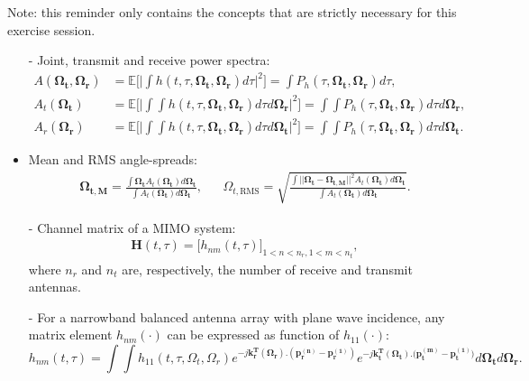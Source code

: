 \documentclass [a4paper, 11pt] {article}
\begin{document}
    \makesessiontitle

    \begin{reminder}

    Note: this reminder only contains the concepts that are strictly necessary for this exercise session.

\begin{itemize}
    \item[-] Joint, transmit and receive power spectra:
    \begin{align}
    A(\mathbf{\Omega_t},\mathbf{\Omega_r}) &= \mathbb{E}\Big[ \Big|\int h(t,\tau, \mathbf{\Omega_t},\mathbf{\Omega_r}) d\tau  \Big|^2 \Big] = \int P_h(\tau, \mathbf{\Omega_t},\mathbf{\Omega_r}) d\tau,\\
    A_t(\mathbf{\Omega_t}) &= \mathbb{E}\Big[ \Big|\int \int h(t,\tau, \mathbf{\Omega_t},\mathbf{\Omega_r}) d\tau d\mathbf{\Omega_r}  \Big|^2 \Big] = \int \int P_h(\tau, \mathbf{\Omega_t},\mathbf{\Omega_r}) d\tau d\mathbf{\Omega_r},\\
    A_r(\mathbf{\Omega_r}) &= \mathbb{E}\Big[ \Big|\int \int h(t,\tau, \mathbf{\Omega_t},\mathbf{\Omega_r}) d\tau d\mathbf{\Omega_t}  \Big|^2 \Big] = \int \int P_h(\tau, \mathbf{\Omega_t},\mathbf{\Omega_r}) d\tau d\mathbf{\Omega_t}.
    \end{align}
    \item Mean and RMS angle-spreads:
    \begin{align}
    \mathbf{\Omega_{t,M}} = \frac{\int \mathbf{\Omega_t} A_t(\mathbf{\Omega_t}) d\mathbf{\Omega_t}}{\int A_t(\mathbf{\Omega_t}) d\mathbf{\Omega_t}},
    && \Omega_{t,\text{RMS}} = \sqrt{\frac{\int \big| \big| \mathbf{\Omega_t} - \mathbf{\Omega_{t,M}} \big| \big|^2 A_t(\mathbf{\Omega_t}) d\mathbf{\Omega_t}}{\int A_t(\mathbf{\Omega_t}) d\mathbf{\Omega_t}}}.
    \end{align}
    \item[-] Channel matrix of a MIMO system:
    \begin{align}
        \mathbf{H}(t,\tau) = \Big[h_{nm}(t,\tau) \Big]_{1<n<n_r,1<m<n_t },
    \end{align}
    where $n_r$ and $n_t$ are, respectively, the number of receive and transmit antennas.
    \item[-] For a narrowband balanced antenna array with plane wave incidence, any matrix element $h_{nm}(\cdot)$ can be expressed as function of $h_{11}(\cdot)$:
    \begin{equation}
    h_{nm}(t,\tau) = \int \int h_{11}(t,\tau,\Omega_t,\Omega_r) e^{-j\mathbf{k_r^T}(\mathbf{\Omega_r}).(\mathbf{p^{(n)}_r} - \mathbf{p^{(1)}_r})} e^{-j\mathbf{k_t^T}(\mathbf{\Omega_t}).(\mathbf{p^{(m)}_t} - \mathbf{p^{(1)}_t)}} d\mathbf{\Omega_t} d\mathbf{\Omega_r}.

\end{equation}
\end{itemize}
\end{reminder}
\end{document}
